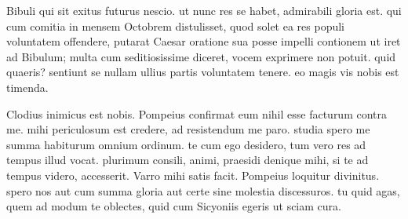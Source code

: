  Bibuli qui sit exitus futurus nescio. ut nunc res se habet, admirabili gloria est. qui cum comitia in mensem Octobrem distulisset, quod solet ea res populi voluntatem offendere, putarat Caesar oratione sua posse impelli contionem ut iret ad Bibulum; multa cum seditiosissime diceret, vocem exprimere non potuit. quid quaeris? sentiunt se nullam ullius partis voluntatem tenere. eo magis vis nobis est timenda.

 Clodius inimicus est nobis. Pompeius confirmat eum nihil esse facturum contra me. mihi periculosum est credere, ad resistendum me paro. studia spero me summa habiturum omnium ordinum. te cum ego desidero, tum vero res ad tempus illud vocat. plurimum consili, animi, praesidi denique mihi, si te ad tempus videro, accesserit. Varro mihi satis facit. Pompeius loquitur divinitus. spero nos aut cum summa gloria aut certe sine molestia discessuros. tu quid agas, quem ad modum te oblectes, quid cum Sicyoniis egeris ut sciam cura.

